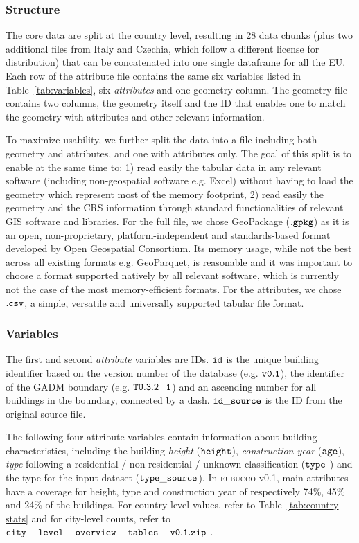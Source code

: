 \documentclass[fleqn,10pt]{wlscirep}
\begin{document}
\subsubsection*{Structure}

The core data are split at the country level, resulting in 28 data chunks (plus two additional files from Italy and Czechia, which follow a different license for distribution) that can be concatenated into one single dataframe for all the EU. Each row of the attribute file contains the same six variables listed in Table~\ref{tab:variables}, six \textit{attributes} and one geometry column. The geometry file contains two columns, the geometry itself and the ID that enables one to match the geometry with attributes and other relevant information. 

To maximize usability, we further split the data into a file including both geometry and attributes, and one with attributes only. The goal of this split is to enable at the same time to: 1) read easily the tabular data in any relevant software (including non-geospatial software e.g. Excel) without having to load the geometry which represent most of the memory footprint, 2) read easily the geometry and the CRS information through standard functionalities of relevant GIS software and libraries. For the full file, we chose GeoPackage ($\tt{.gpkg}$) as it is an open, non-proprietary, platform-independent and standards-based format developed by Open Geospatial Consortium. Its memory usage, while not the best across all existing formats e.g. GeoParquet, is reasonable and it was important to choose a format supported natively by all relevant software, which is currently not the case of the most memory-efficient formats. For the attributes, we chose $\tt{.csv}$, a simple, versatile and universally supported tabular file format. 

\subsubsection*{Variables}
The first and second \textit{attribute} variables are IDs.  ${\tt id}$ is the unique building identifier based on the version number of the database (e.g. ${\tt  v0.1}$), the identifier of the GADM boundary (e.g. ${\tt TU.3.2\_1}$) and an ascending number for all buildings in the boundary, connected by a dash. 
${\tt id\_source}$ is the ID from the original source file.
 
The following four attribute variables contain information about building characteristics, including the building \textit{height} (${\tt height}$), \textit{construction year} ($\tt{age}$), \textit{type} following a residential / non-residential / unknown classification (${\tt type}$ ) and the type for the input dataset (${\tt type\_source}$). In \textsc{eubucco} v0.1, main attributes have a coverage for height, type and construction year of respectively 74\%, 45\% and 24\% of the buildings. For country-level values, refer to  Table~\ref{tab:country stats}  and for city-level counts, refer to ${\tt city-level-overview-tables-v0.1.zip}$ .  
\end{document}
